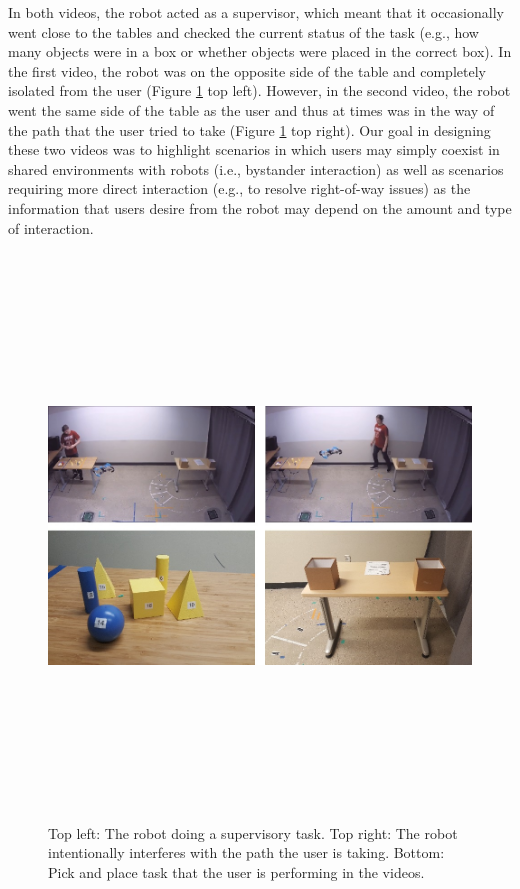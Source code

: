 \documentclass[letterpaper, 10 pt, conference]{ieeeconf}  %
\begin{document}
    In both videos, the robot acted as a supervisor, which meant that it occasionally went close to the tables and checked the current status of the task (e.g., how many objects were in a box or whether objects were placed in the correct box). In the first video, the robot was on the opposite side of the table and completely isolated from the user (Figure \ref{fig:task} top left). However, in the second video, the robot went the same side of the table as the user and thus at times was in the way of the path that the user tried to take (Figure \ref{fig:task} top right). Our goal in designing these two videos was to highlight scenarios in which users may simply coexist in shared environments with robots (i.e., bystander interaction) as well as scenarios requiring more direct interaction (e.g., to resolve right-of-way issues) as the information that users desire from the robot may depend on the amount and type of interaction. %
    
    \begin{figure}[h]
    \includegraphics[width=\textwidth,height=15cm]{task.jpg}
    \caption{Top left: The robot doing a supervisory task. Top right: The robot intentionally interferes with the path the user is taking. Bottom: Pick and place task that the user is performing in the videos.}
    \label{fig:task}
    \end{figure}
    
\end{document}
